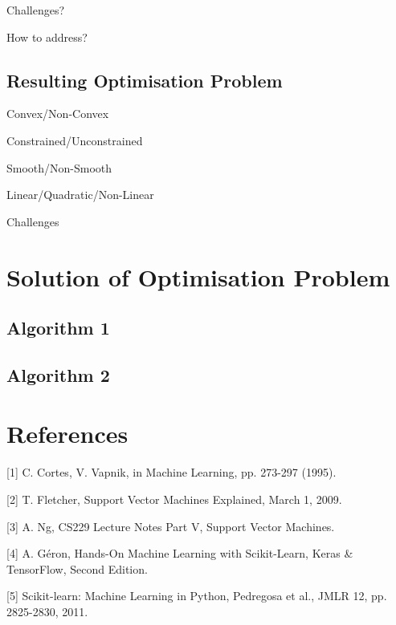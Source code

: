 \documentclass[10pt, a4paper,reqno]{amsart}
\begin{document}


Challenges?

How to address?

\subsection{Resulting Optimisation Problem}\hfill

Convex/Non-Convex

Constrained/Unconstrained

Smooth/Non-Smooth

Linear/Quadratic/Non-Linear

Challenges


\section{Solution of Optimisation Problem}

\subsection{Algorithm 1}\hfill

\subsection{Algorithm 2}\hfill


\section{References}

[1] C. Cortes, V. Vapnik, in Machine Learning, pp. 273-297 (1995).

[2] T. Fletcher, Support Vector Machines Explained, March 1, 2009.

[3] A. Ng, CS229 Lecture Notes Part V, Support Vector Machines.

[4] A. G\'{e}ron, Hands-On Machine Learning with Scikit-Learn, Keras \& TensorFlow, Second Edition.

[5] Scikit-learn: Machine Learning in Python, Pedregosa et al., JMLR 12, pp. 2825-2830, 2011.
\end{document}
